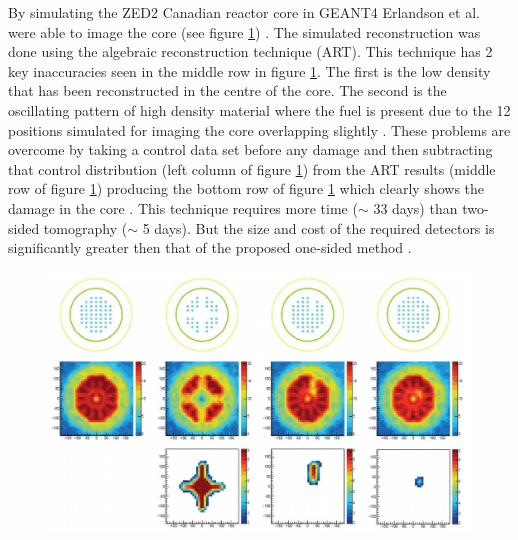 By simulating the ZED2 Canadian reactor core in GEANT4 Erlandson et al. were able to image the core (see figure \ref{fig:Zed2OstSimulation}) \cite{Erlandson_reactorOST_2018} . The simulated reconstruction was done using the algebraic reconstruction technique (ART). This technique has 2 key inaccuracies seen in the middle row in figure \ref{fig:Zed2OstSimulation}. The first is the low density that has been reconstructed in the centre of the core. The second is the oscillating pattern of high density material where the fuel is present due to the 12 positions simulated for imaging the core overlapping slightly \cite{Erlandson_reactorOST_2018} . These problems are overcome by taking a control data set before any damage and then subtracting that control distribution (left column of figure \ref{fig:Zed2OstSimulation}) from the ART results (middle row of figure \ref{fig:Zed2OstSimulation}) producing the bottom row of figure \ref{fig:Zed2OstSimulation} which clearly shows the damage in the core \cite{Erlandson_reactorOST_2018}. This technique requires more time ($\sim$ 33 days) than two-sided tomography ($\sim$ 5 days). But the size and cost of the required detectors is significantly greater then that of the proposed one-sided method \cite{Erlandson_reactorOST_2018}. 

\begin{figure}[!h]
 \centering
 \includegraphics[width=1.0\linewidth]{Chapter5/Figs/MuTomographyExamples/Zed2OstSimulation.jpg}
 \label{fig:Zed2OstSimulation}
\end{figure}

